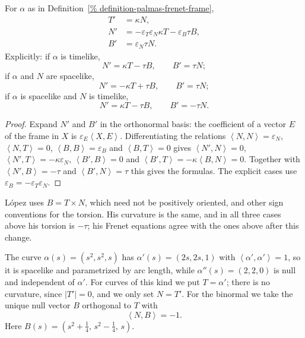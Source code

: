 \begin{proposition}
\label{proposition-palmas-frenet-equations}
For $\alpha$ as in
Definition~\ref{%
definition-palmas-frenet-frame},
$$
\begin{aligned}
T'&=\kappa N,\\
N'&=-\varepsilon_T\varepsilon_N\kappa T
-\varepsilon_B\tau B,\\
B'&=\varepsilon_N\tau N.
\end{aligned}
$$
Explicitly: if $\alpha$ is timelike,
$$
N'=\kappa T-\tau B,\qquad B'=\tau N;
$$
if $\alpha$ and $N$ are spacelike,
$$
N'=-\kappa T+\tau B,\qquad B'=\tau N;
$$
if $\alpha$ is spacelike and $N$ is
timelike,
$$
N'=\kappa T-\tau B,\qquad B'=-\tau N.
$$
\end{proposition}

\begin{proof}
Expand $N'$ and $B'$ in the orthonormal
basis: the coefficient of a vector $E$ of
the frame in $X$ is
$\varepsilon_E\left\langle{} X,E
\right\rangle{}$. Differentiating the
relations
$\left\langle{} N,N \right\rangle{}
=\varepsilon_N$,
$\left\langle{} N,T \right\rangle{}=0$,
$\left\langle{} B,B \right\rangle{}
=\varepsilon_B$ and
$\left\langle{} B,T \right\rangle{}=0$
gives
$\left\langle{} N',N \right\rangle{}=0$,
$\left\langle{} N',T \right\rangle{}
=-\kappa\varepsilon_N$,
$\left\langle{} B',B \right\rangle{}=0$ and
$\left\langle{} B',T \right\rangle{}
=-\kappa\left\langle{} B,N
\right\rangle{}=0$. Together with
$\left\langle{} N',B \right\rangle{}
=-\tau$ and
$\left\langle{} B',N \right\rangle{}=\tau$
this gives the formulas. The explicit cases
use $\varepsilon_B=-\varepsilon_T
\varepsilon_N$.
\end{proof}

López \cite[Section
2.2]{lopez2014differential} uses $B=T\times
N$, which need not be positively oriented,
and other sign conventions for the torsion.
His curvature is the same, and in all three
cases above his torsion is $-\tau$; his
Frenet equations agree with the ones above
after this change.

\begin{example}
\label{example-palmas-pseudo-null-curve}
The curve $\alpha(s)=(s^2,s^2,s)$ has
$\alpha'(s)=(2s,2s,1)$ with
$\left\langle{} \alpha',\alpha'
\right\rangle{}=1$, so it is spacelike and
parametrized by arc length, while
$\alpha''(s)=(2,2,0)$ is null and
independent of $\alpha'$. For curves of
this kind we put $T=\alpha'$; there is no
curvature, since $|T'|=0$, and we only set
$N=T'$. For the binormal we take the
unique null vector $B$ orthogonal to $T$
with
$$
\left\langle{} N,B \right\rangle{}=-1.
$$
Here
$B(s)=(s^2+\tfrac14,\,s^2-\tfrac14,\,s)$.
\end{example}

